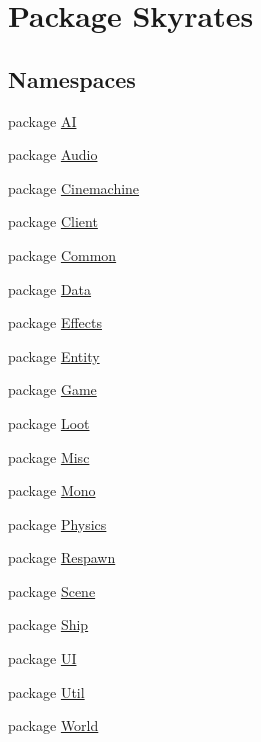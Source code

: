 \hypertarget{namespace_skyrates}{\section{Package Skyrates}
\label{namespace_skyrates}
}
\subsection*{Namespaces}
\begin{DoxyCompactItemize}
\item 
package \hyperlink{namespace_skyrates_1_1_a_i}{A\-I}
\item 
package \hyperlink{namespace_skyrates_1_1_audio}{Audio}
\item 
package \hyperlink{namespace_skyrates_1_1_cinemachine}{Cinemachine}
\item 
package \hyperlink{namespace_skyrates_1_1_client}{Client}
\item 
package \hyperlink{namespace_skyrates_1_1_common}{Common}
\item 
package \hyperlink{namespace_skyrates_1_1_data}{Data}
\item 
package \hyperlink{namespace_skyrates_1_1_effects}{Effects}
\item 
package \hyperlink{namespace_skyrates_1_1_entity}{Entity}
\item 
package \hyperlink{namespace_skyrates_1_1_game}{Game}
\item 
package \hyperlink{namespace_skyrates_1_1_loot}{Loot}
\item 
package \hyperlink{namespace_skyrates_1_1_misc}{Misc}
\item 
package \hyperlink{namespace_skyrates_1_1_mono}{Mono}
\item 
package \hyperlink{namespace_skyrates_1_1_physics}{Physics}
\item 
package \hyperlink{namespace_skyrates_1_1_respawn}{Respawn}
\item 
package \hyperlink{namespace_skyrates_1_1_scene}{Scene}
\item 
package \hyperlink{namespace_skyrates_1_1_ship}{Ship}
\item 
package \hyperlink{namespace_skyrates_1_1_u_i}{U\-I}
\item 
package \hyperlink{namespace_skyrates_1_1_util}{Util}
\item 
package \hyperlink{namespace_skyrates_1_1_world}{World}
\end{DoxyCompactItemize}
